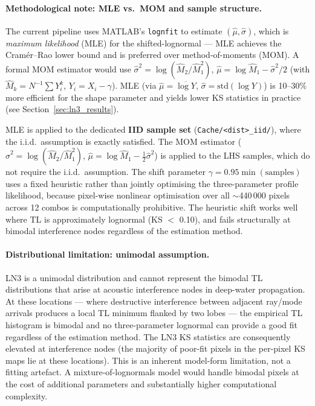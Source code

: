 \documentclass[11pt,a4paper]{article}
\begin{document}
\paragraph{Methodological note: MLE vs.\ MOM and sample structure.}
The current pipeline uses MATLAB's \texttt{lognfit} to estimate $(\hat\mu, \hat\sigma)$,
which is \emph{maximum likelihood} (MLE) for the shifted-lognormal --- MLE achieves
the Cramér--Rao lower bound and is preferred over method-of-moments (MOM).
A formal MOM estimator would use
$\hat\sigma^2 = \log(\hat M_2/\hat M_1^2)$, $\hat\mu = \log \hat M_1 - \hat\sigma^2/2$
(with $\hat M_k = N^{-1}\sum Y_i^k$, $Y_i = X_i - \gamma$).
MLE (via $\hat\mu = \overline{\log Y}$, $\hat\sigma = \mathrm{std}(\log Y)$) is
10--30\% more efficient for the shape parameter and yields lower KS statistics
in practice (see Section~\ref{sec:ln3_results}).

MLE is applied to the dedicated \textbf{IID sample set}
(\texttt{Cache/<dist>\_iid/}), where the i.i.d.\ assumption is exactly satisfied.
The MOM estimator ($\hat\sigma^2 = \log(\hat M_2/\hat M_1^2)$, $\hat\mu = \log\hat M_1 - \tfrac{1}{2}\hat\sigma^2$)
is applied to the LHS samples, which do not require the i.i.d.\ assumption.
The shift parameter $\gamma = 0.95\min(\text{samples})$ uses a fixed heuristic rather
than jointly optimising the three-parameter profile likelihood, because pixel-wise
nonlinear optimisation over all $\sim$440\,000 pixels across 12 combos is computationally
prohibitive.  The heuristic shift works well where TL is approximately lognormal
(KS $<$ 0.10), and fails structurally at bimodal interference nodes regardless
of the estimation method.

\paragraph{Distributional limitation: unimodal assumption.}
LN3 is a unimodal distribution and cannot represent the bimodal TL distributions
that arise at acoustic interference nodes in deep-water propagation.
At these locations --- where destructive interference between adjacent ray/mode
arrivals produces a local TL minimum flanked by two lobes --- the empirical TL
histogram is bimodal and no three-parameter lognormal can provide a good fit
regardless of the estimation method.
The LN3 KS statistics are consequently elevated at interference nodes (the
majority of poor-fit pixels in the per-pixel KS maps lie at these locations).
This is an inherent model-form limitation, not a fitting artefact.
A mixture-of-lognormals model would handle bimodal pixels at the cost of
additional parameters and substantially higher computational complexity.
\end{document}

